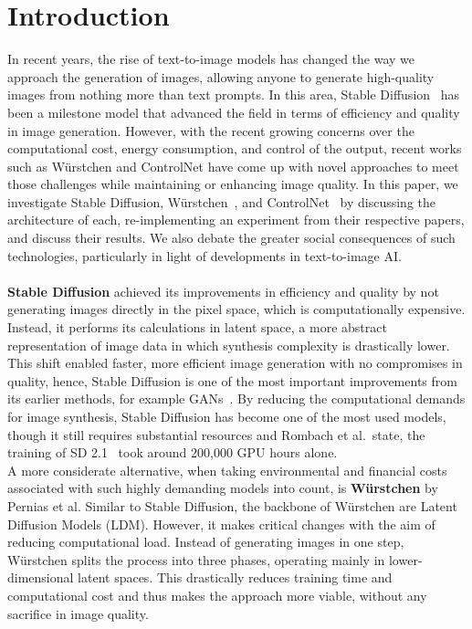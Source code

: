 \section{Introduction}
In recent years, the rise of text-to-image models has changed the way we approach the generation of images, allowing anyone to generate high-quality images from nothing more than text prompts. In this area, Stable Diffusion~\cite{rombach2022stablediffusion} has been a milestone model that advanced the field in terms of efficiency and quality in image generation. However, with the recent growing concerns over the computational cost, energy consumption, and control of the output, recent works such as Würstchen and ControlNet have come up with novel approaches to meet those challenges while maintaining or enhancing image quality. In this paper, we investigate Stable Diffusion, Würstchen~\cite{pernias2024wrstchen}, and ControlNet~\cite{zhang2023addingconditionalcontroltexttoimage} by discussing the architecture of each, re-implementing an experiment from their respective papers, and discuss their results. We also debate the greater social consequences of such technologies, particularly in light of developments in text-to-image AI.
\\
\\
\textbf{Stable Diffusion} achieved its improvements in efficiency and quality by not generating images directly in the pixel space, which is computationally expensive. Instead, it performs its calculations in latent space, a more abstract representation of image data in which synthesis complexity is drastically lower. This shift enabled faster, more efficient image generation with no compromises in quality, hence, Stable Diffusion is one of the most important improvements from its earlier methods, for example GANs~\cite{dhariwal2021diffusionmodelsbeatgans}. By reducing the computational demands for image synthesis, Stable Diffusion has become one of the most used models, though it still requires substantial resources and Rombach et al.\ state, the training of SD 2.1~\cite{rombach2023sd_2_1} took around 200,000 GPU hours alone.
\\
A more considerate alternative, when taking environmental and financial costs associated with such highly demanding models into count, is \textbf{Würstchen} by Pernias et al. Similar to Stable Diffusion, the backbone of Würstchen are Latent Diffusion Models (LDM). However, it makes critical changes with the aim of reducing computational load. Instead of generating images in one step, Würstchen splits the process into three phases, operating mainly in lower-dimensional latent spaces. This drastically reduces training time and computational cost and thus makes the approach more viable, without any sacrifice in image quality.
